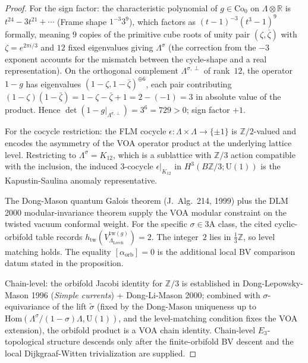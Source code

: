 \begin{proof}
For the sign factor: the characteristic polynomial of
$g \in \mathrm{Co}_0$ on $\Lambda \otimes \mathbb{R}$ is
$t^{24} - 3 t^{21} + \cdots$ (Frame shape $1^{-3} 3^9$), which
factors as $(t - 1)^{-3}(t^3 - 1)^9$ formally, meaning $9$ copies of
the primitive cube roots of unity pair $(\zeta, \bar\zeta)$ with
$\zeta = e^{2\pi i/3}$ and $12$ fixed eigenvalues giving $\Lambda^\sigma$
(the correction from the $-3$ exponent accounts for the mismatch
between the cycle-shape and a real representation). On the orthogonal
complement $\Lambda^{\sigma,\perp}$ of rank~$12$, the operator $1 - g$
has eigenvalues $(1 - \zeta, 1 - \bar\zeta)^{\oplus 6}$, each pair
contributing $(1-\zeta)(1-\bar\zeta) = 1 - \zeta - \bar\zeta + 1
= 2 - (-1) = 3$ in absolute value of the product. Hence
$\det(1 - g|_{\Lambda^{\sigma,\perp}}) = 3^6 = 729 > 0$; sign factor
$+1$.

For the cocycle restriction: the FLM cocycle $\epsilon \colon \Lambda
\times \Lambda \to \{\pm 1\}$ is $\mathbb{Z}/2$-valued and encodes
the asymmetry of the VOA operator product at the underlying lattice
level. Restricting to $\Lambda^\sigma = K_{12}$, which is a sublattice
with $\mathbb{Z}/3$ action compatible with the inclusion, the
induced $3$-cocycle $\epsilon|_{K_{12}}$ in
$H^3(B\mathbb{Z}/3; \mathrm{U}(1))$ is the Kapustin-Saulina
anomaly representative.

The Dong-Mason quantum Galois theorem (J.~Alg.~214, 1999) plus the
DLM 2000 modular-invariance theorem supply the VOA modular constraint
on the twisted vacuum conformal weight. For the specific
$\sigma \in 3\mathrm{A}$ class, the cited cyclic-orbifold table records
$h_{\mathrm{tw}}(V_{\Lambda_{\mathrm{Leech}}}^{\mathrm{tw}(g)}) = 2$.
The integer~$2$ lies in $\frac{1}{3}\mathbb{Z}$, so level matching
holds. The equality $[\alpha_{\mathrm{orb}}]=0$ is the additional
local BV comparison datum stated in the proposition.

Chain-level: the orbifold Jacobi identity for $\mathbb{Z}/3$ is
established in Dong-Lepowsky-Mason 1996 (\emph{Simple currents}) +
Dong-Li-Mason 2000; combined with $\sigma$-equivariance of the lift
$\widetilde{\sigma}$ (fixed by the Dong-Mason uniqueness up to
$\mathrm{Hom}(\Lambda^\sigma / (1 - \sigma)\Lambda, \mathrm{U}(1))$,
and the level-matching condition fixes the VOA extension), the
orbifold product is a VOA chain identity. Chain-level
$E_3$-topological structure descends only after the finite-orbifold BV
descent and the local Dijkgraaf-Witten trivialization are supplied.
\end{proof}


